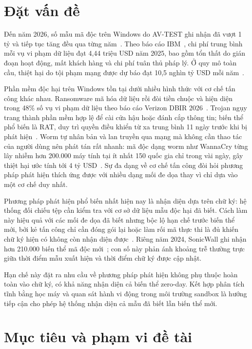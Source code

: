 \documentclass[../DoAn.tex]{subfiles}
\begin{document}
\section{Đặt vấn đề}
\label{section:1.1}

Đến năm 2026, số mẫu mã độc trên Windows do AV-TEST ghi nhận đã vượt
1 tỷ và tiếp tục tăng đều qua từng năm~\cite{avtest2025}. Theo báo cáo IBM~\cite{ibm2025}, chi phí trung
bình mỗi vụ vi phạm dữ liệu đạt 4,44 triệu USD năm 2025, bao gồm tổn
thất do gián đoạn hoạt động, mất khách hàng và chi phí tuân thủ pháp lý.
Ở quy mô toàn cầu, thiệt hại do tội phạm mạng được dự báo đạt 10,5
nghìn tỷ USD mỗi năm~\cite{cybercrime2025}.

Phần mềm độc hại trên Windows tồn tại dưới nhiều hình thức với cơ chế
tấn công khác nhau. Ransomware mã hóa dữ liệu rồi đòi tiền chuộc và
hiện diện trong 48\% số vụ vi phạm dữ liệu theo báo cáo Verizon DBIR
2026~\cite{verizon2026}. Trojan ngụy trang thành phần mềm hợp lệ để cài
cửa hậu hoặc đánh cắp thông tin; biến thể phổ biến là RAT, duy trì
quyền điều khiển từ xa trung bình 11 ngày trước khi bị phát
hiện~\cite{mandiant2025}. Worm tự nhân bản và lan truyền qua mạng mà
không cần thao tác của người dùng nên phát tán rất nhanh: mã độc dạng
worm như WannaCry từng lây nhiễm hơn 200.000 máy tính tại ít nhất 150
quốc gia chỉ trong vài ngày, gây thiệt hại ước tính tới 4 tỷ
USD~\cite{wannacry2017}. Sự đa dạng về cơ chế tấn công đòi hỏi phương
pháp phát hiện thích ứng được với nhiều dạng mối đe dọa thay vì chỉ
dựa vào một cơ chế duy nhất.

Phương pháp phát hiện phổ biến nhất hiện nay là nhận diện dựa trên chữ
ký: hệ thống đối chiếu tệp cần kiểm tra với cơ sở dữ liệu mẫu độc hại
đã biết. Cách làm này hiệu quả với các mối đe dọa đã biết nhưng bộc lộ
hạn chế trước biến thể mới, bởi kẻ tấn công chỉ cần đóng gói lại hoặc
làm rối mã thực thi là đủ khiến chữ ký hiện có không còn nhận diện
được~\cite{gibert2020}. Riêng năm 2024, SonicWall ghi nhận hơn 210.000
biến thể mã độc mới~\cite{sonicwall2025}; con số này phản ánh khoảng
trễ thường trực giữa thời điểm mẫu xuất hiện và thời điểm chữ ký được
cập nhật.

Hạn chế này đặt ra nhu cầu về phương pháp phát hiện không phụ thuộc
hoàn toàn vào chữ ký, có khả năng nhận diện cả biến thể zero-day. Kết
hợp phân tích tĩnh bằng học máy và quan sát hành
vi động trong môi trường sandbox là hướng tiếp cận cho phép hệ thống
nhận diện cả mẫu đã biết lẫn biến thể mới.

\section{Mục tiêu và phạm vi đề tài}
\label{section:1.2}
\end{document}
